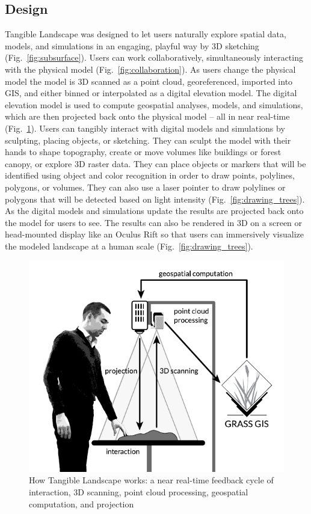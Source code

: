 \documentclass[prodmode,acmtochi]{acmsmall} %
\begin{document}
\subsection{Design}
Tangible Landscape was designed to let users naturally explore 
spatial data, models, and simulations in an engaging, playful way
by 3D sketching (Fig.~\ref{fig:subsurface}). 
Users can work collaboratively, 
simultaneously interacting with the physical model 
(Fig.~\ref{fig:collaboration}). 
As users change the physical model
the model is 3D scanned as a point cloud, georeferenced, imported into GIS, 
and either binned or interpolated as a digital elevation model. 
The digital elevation model is used to compute 
geospatial analyses, models, and simulations, 
which are then projected back onto the physical model 
-- all in near real-time (Fig.~\ref{fig:system_schema}). 
Users can tangibly interact with digital models and simulations
by sculpting, placing objects, or sketching.
%
They can sculpt the model with their hands
to shape topography, 
create or move volumes
like buildings or forest canopy, 
or explore 3D raster data.  
%
They can place objects or markers 
that will be identified using object and color recognition
in order to draw points, polylines, polygons, or volumes. 
They can also use a laser pointer to draw polylines or polygons
that will be detected based on light intensity (Fig.~\ref{fig:drawing_trees}). 
As the digital models and simulations update
the results are projected back onto the model for users to see. 
The results can also be rendered in 3D 
on a screen or head-mounted display like an Oculus Rift
so that users can immersively visualize the modeled landscape 
at a human scale 
(Fig.~\ref{fig:drawing_trees}).

\begin{figure}
\begin{center}
		\includegraphics{images/system_schema.pdf}
	\caption{How Tangible Landscape works: a near real-time feedback cycle of interaction, 3D scanning, point cloud processing, geospatial computation, and projection}
	\label{fig:system_schema}
\end{center}
\end{figure}
\end{document}
